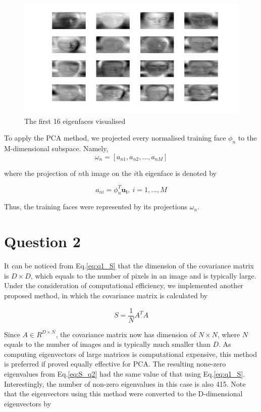 \documentclass[10pt,twocolumn,letterpaper]{article}
\begin{document}
\begin{figure}
	\begin{center}
		\includegraphics[width=0.8\linewidth]{q1_eigenfaces}
		\caption{The first 16 eigenfaces visualised}
		\label{fig:eigFaces}
	\end{center}
\end{figure}

To apply the PCA method, we projected every normalised training face $\phi_n$ to the M-dimensional subspace. Namely,
\begin{equation}
\omega_n = [a_{n1}, a_{n2}, ..., a_{nM}]
\label{eq:project}
\end{equation}

where the projection of $n$th image on the $i$th eigenface is denoted by

$$ a_{ni} = \phi_n^T \boldsymbol{u_i}, ~  i = 1,...,M$$

Thus, the training faces were represented by its projections $\omega_n$. \\


\section{Question 2}
It can be noticed from Eq.\ref{eq:q1_S} that the dimension of the covariance matrix is $D\times D$, which equals to the number of pixels in an image and is typically large. Under the consideration of computational efficiency, we implemented another proposed method, in which the covariance matrix is calculated by

\begin{equation}
S = \frac{1}{N} A^T A
\label{eq:S_q2}
\end{equation}

Since $A \in R^{D \times N}$, the covariance matrix now has dimension of $N \times N$, where $N$ equals to the number of images and is typically much smaller than $D$. As computing eigenvectors of large matrices is computational expensive, this method is preferred if proved equally effective for PCA. The resulting none-zero eigenvalues from Eq.\ref{eq:S_q2} had the same value of that using Eq.\ref{eq:q1_S}. Interestingly, the number of non-zero eigenvalues in this case is also 415. Note that the eigenvectors using this method were converted to the D-dimensional eigenvectors by 
\end{document}
